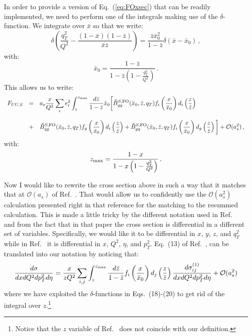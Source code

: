 \documentclass[10pt,a4paper]{article}
\begin{document}
In order to provide a version of Eq.~(\ref{eq:FOxsec}) that can be
readily implemented, we need to perform one of the integrals making
use of the $\delta$-function. We integrate over $\bar{x}$ so that we
write:
\begin{equation}
\delta\left(\frac{q_T^2}{Q^2}-\frac{(1-\bar{x})(1-\bar{z})}{\bar{x}\bar{z}}\right)
= \frac{\bar{z}\bar{x}_0^2}{1-\bar{z}}\delta(\bar{x} - \bar{x}_0)\,,
\end{equation}
with:
\begin{equation}\label{eq:x0bar}
  \bar{x}_0 = \frac{1-\bar{z}}{1-\bar{z}\left(1-\frac{q_T^2}{Q^2}\right)}\,.
\end{equation}
This allows us to write:
\begin{equation}\label{eq:FOxsecFin}
\begin{array}{rcl}
  F_{UU,S}&=&\displaystyle 
  a_s\frac{x }{Q^2}\sum_{i}e_i^2\int_z^{z_{\rm max}} \frac{d\bar{z}}{1-\bar{z}}\bar{x}_0\bigg[\hat{B}_{qq}^{S,
    \rm FO}(\bar{x}_0,\bar{z},q_T)f_i\left(\frac{x}{\bar{x}_0}\right)
              d_i\left(\frac{z}{\bar{z}}\right)\\
\\
&+&\displaystyle \hat{B}_{qg}^{S,
    \rm FO}(\bar{x}_0,\bar{z},q_T)f_g\left(\frac{x}{\bar{x}_0}\right)
              d_i\left(\frac{z}{\bar{z}}\right)+ \hat{B}_{gq}^{S,
    \rm FO}(\bar{x}_0,\bar{z},q_T)f_i\left(\frac{x}{\bar{x}_0}\right)
              d_g\left(\frac{z}{\bar{z}}\right)\bigg]
+\mathcal{O}(a_s^2)\,,
\end{array}
\end{equation}
with:
\begin{equation}
z_{\rm max} = \frac{1-x}{1-x\left(1-\frac{q_T^2}{Q^2}\right)}\,.
\end{equation}

Now I would like to rewrite the cross section above in such a way that
it matches that at $\mathcal{O}(a_s)$ of
Ref.~\cite{Daleo:2004pn}. That would allow us to confidently use the
$\mathcal{O}(a_s^2)$ calculation presented right in that reference for
the matching to the resummed calculation. This is made a little tricky
by the different notation used in Ref.~\cite{Daleo:2004pn} and from
the fact that in that paper the cross section is differential in a
different set of variables. Specifically, we would like it to be
differential in $x$, $y$, $z$, and $q_T^2$ while in
Ref.~\cite{Daleo:2004pn} it is differential in $x$, $Q^2$, $\eta$, and
$p_T^2$. Eq.~(13) of Ref.~\cite{Daleo:2004pn}, can be translated into
our notation by noticing that:
\begin{equation}\label{eq:Daleoetal}
\frac{d\sigma}{dxdQ^2d p_T^2 d\eta} = \frac{x}{z Q^2}\sum_{i,j}\int_z^{z_{\rm
    max}} \frac{d\bar{z}}{1-\bar{z}} f_i\left(\frac{x}{\bar{x}_0}\right)d_j\left(\frac{z}{\bar{z}}\right) \frac{d\sigma_{ij}^{(1)}}{dxdQ^2d p_T^2 d\eta}+\mathcal{O}(a_s^2)
\end{equation}
where we have exploited the $\delta$-functions in Eqs.~(18)-(20) to
get rid of the integral over $z$.\footnote{Notice that the $z$
  variable of Ref.~\cite{Daleo:2004pn} does not coincide with our
  definition.}
\end{document}
